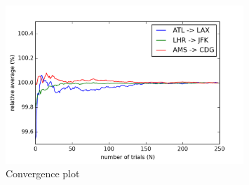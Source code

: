 \begin{figure}
\centering
\includegraphics[width=0.8\textwidth]{figures/ConvergencePlot_multiple}
\caption{Convergence plot}
\label{fig:ConvergencePlotMultiple}
\end{figure}
